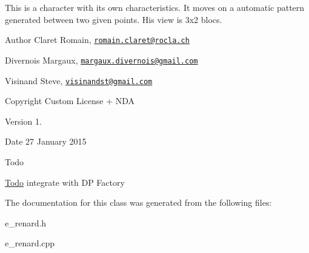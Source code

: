 This is a character with its own characteristics. It moves on a automatic pattern generated between two given points. His view is 3x2 blocs. \begin{DoxyAuthor}{Author}
Claret Romain, \href{mailto:romain.claret@rocla.ch}{\tt romain.\+claret@rocla.\+ch} 

Divernois Margaux, \href{mailto:margaux.divernois@gmail.com}{\tt margaux.\+divernois@gmail.\+com} 

Visinand Steve, \href{mailto:visinandst@gmail.com}{\tt visinandst@gmail.\+com} 
\end{DoxyAuthor}
\begin{DoxyCopyright}{Copyright}
Custom License + N\+D\+A 
\end{DoxyCopyright}
\begin{DoxyVersion}{Version}
1. 
\end{DoxyVersion}
\begin{DoxyDate}{Date}
27 January 2015 
\end{DoxyDate}
\begin{DoxyRefDesc}{Todo}
\item[\hyperlink{todo__todo000005}{Todo}]integrate with D\+P Factory \end{DoxyRefDesc}


The documentation for this class was generated from the following files\+:\begin{DoxyCompactItemize}
\item 
e\+\_\+renard.\+h\item 
e\+\_\+renard.\+cpp\end{DoxyCompactItemize}
